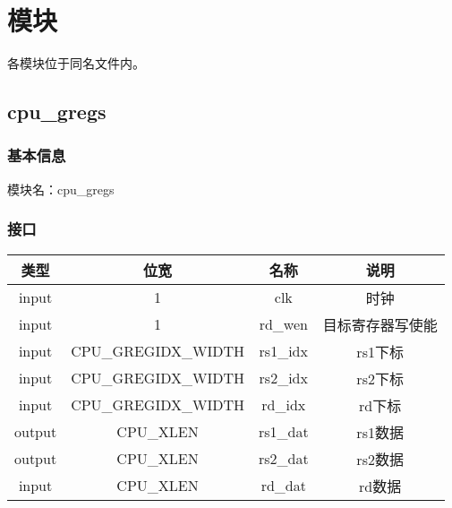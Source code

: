 %
%
%
%
%
%
%
%

\chapter{模块}
各模块位于同名文件内。

\section{cpu\_gregs}
\subsection{基本信息}
模块名：cpu\_gregs
\subsection{接口}
\begin{tabular}{|c|c|c|c|}
    \hline
    类型    &   位宽    &   名称    &   说明\\\hline
    input   &   1   &   clk &   时钟\\\hline
    input   &   1   &   rd\_wen  &   目标寄存器写使能\\\hline
    input   &   CPU\_GREGIDX\_WIDTH &   rs1\_idx    &   rs1下标\\\hline
    input   &   CPU\_GREGIDX\_WIDTH &   rs2\_idx    &   rs2下标\\\hline
    input   &   CPU\_GREGIDX\_WIDTH &   rd\_idx    &   rd下标\\\hline
    output   &   CPU\_XLEN &   rs1\_dat    &   rs1数据\\\hline
    output   &   CPU\_XLEN &   rs2\_dat    &   rs2数据\\\hline
    input   &   CPU\_XLEN &   rd\_dat    &   rd数据\\\hline
\end{tabular}
